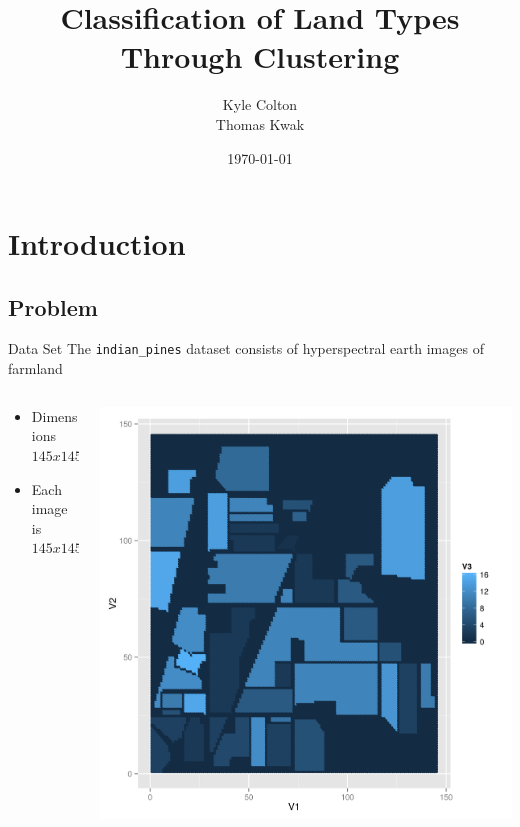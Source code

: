 \documentclass[11pt]{beamer}
\author{Kyle Colton\\Thomas Kwak}
\title{Classification of Land Types Through Clustering}
\institute{Math 191}
\date{\today}
\begin{document}
\begin{frame}
\titlepage
\end{frame}


\section{Introduction}
\subsection{Problem}
\begin{frame}{Data Set}
The \texttt{indian\_pines} dataset consists of hyperspectral earth images of farmland
\begin{columns}[T]
\begin{column}{.48\textwidth}
\begin{itemize}
\item Dimensions $145 x 145 x 200$
\item Each image is $145x145$
\end{itemize}
\end{column}
\hfill
\begin{column}{.48\textwidth}
\includegraphics[scale=.3]{gt.png}
\end{column}
\end{columns}
\end{frame}
\end{document}
